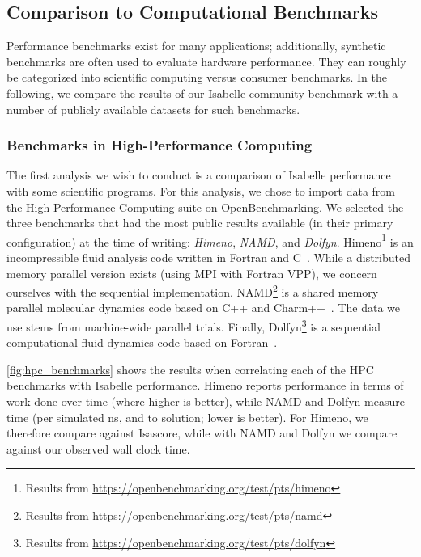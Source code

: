 \subsection{Comparison to Computational Benchmarks}
Performance benchmarks exist for many applications;
additionally, synthetic benchmarks are often used to evaluate hardware performance.
They can roughly be categorized into scientific computing versus consumer benchmarks. 
In the following, we compare the results of our Isabelle community benchmark with a number of publicly available datasets for such benchmarks.

\subsubsection{Benchmarks in High-Performance Computing}
The first analysis we wish to conduct is a comparison of Isabelle performance with some scientific programs.
For this analysis, we chose to import data from the High Performance Computing suite on OpenBenchmarking.
We selected the three benchmarks that had the most public results available
(in their primary configuration)
at the time of writing: \emph{Himeno}, \emph{NAMD}, and \emph{Dolfyn}.
Himeno\footnote{Results from \url{https://openbenchmarking.org/test/pts/himeno}} is an incompressible fluid analysis code written in Fortran and C~\cite{himeno}.
While a distributed memory parallel version exists (using MPI with Fortran VPP),
we concern ourselves with the sequential implementation.
NAMD\footnote{Results from \url{https://openbenchmarking.org/test/pts/namd}} is a shared memory parallel molecular dynamics code based on C++ and Charm++~\cite{namd}.
The data we use stems from machine-wide parallel trials.
Finally, Dolfyn\footnote{Results from \url{https://openbenchmarking.org/test/pts/dolfyn}} is a sequential computational fluid dynamics code based on Fortran~\cite{dolfyn}.



\autoref{fig:hpc_benchmarks} shows the results when correlating each of the HPC benchmarks with Isabelle performance.
Himeno reports performance in terms of work done over time
(where higher is better),
while NAMD and Dolfyn measure time
(per simulated \si{\nano\second}, and to solution;
lower is better).
For Himeno, we therefore compare against Isascore,
while with NAMD and Dolfyn we compare against our observed wall clock time.


